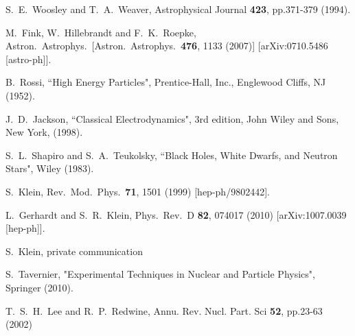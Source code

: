 \documentclass[twocolumn,preprintnumbers,amsmath,amssymb,prd, superscriptaddress]{revtex4} %
\begin{document}
\begin{thebibliography}{99}
  S.~E.~Woosley and T.~A.~Weaver, Astrophysical Journal {\bf 423}, pp.371-379 (1994).

  M.~Fink, W.~Hillebrandt and F.~K.~Roepke,
  Astron.\ Astrophys.\
  [Astron.\ Astrophys.\  {\bf 476}, 1133 (2007)]
  [arXiv:0710.5486 [astro-ph]].


B.~Rossi, ``High Energy Particles", Prentice-Hall, Inc., Englewood Cliffs, NJ (1952).

J.~D.~Jackson, ``Classical Electrodynamics", 3rd edition, John Wiley and Sons, New
York, (1998).

S.~L.~Shapiro and S.~A.~Teukolsky, ``Black Holes, White Dwarfs, and Neutron Stars", Wiley (1983).

  S.~Klein,
  Rev.\ Mod.\ Phys.\  {\bf 71}, 1501 (1999)
  [hep-ph/9802442].

  L.~Gerhardt and S.~R.~Klein,
  Phys.\ Rev.\ D {\bf 82}, 074017 (2010)
  [arXiv:1007.0039 [hep-ph]].

S.~Klein, private communication

S.~Tavernier, "Experimental Techniques in Nuclear and Particle Physics", Springer (2010).

T.~S.~H.~Lee and R.~P.~Redwine,
 Annu. Rev. Nucl. Part. Sci {\bf 52}, pp.23-63 (2002)


\end{thebibliography}
\end{document}
